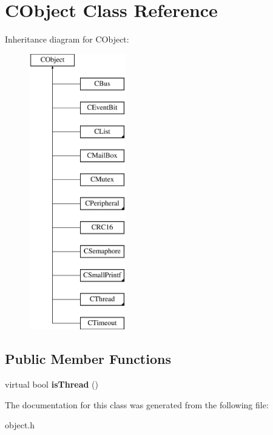 \hypertarget{class_c_object}{\section{C\-Object Class Reference}
\label{class_c_object}
}
Inheritance diagram for C\-Object\-:\begin{figure}[H]
\begin{center}
\leavevmode
\includegraphics[height=12.000000cm]{class_c_object}
\end{center}
\end{figure}
\subsection*{Public Member Functions}
\begin{DoxyCompactItemize}
\item 
\hypertarget{class_c_object_a26a76c241a4d62d2efdac57d2cfe4c0f}{virtual bool {\bfseries is\-Thread} ()}\label{class_c_object_a26a76c241a4d62d2efdac57d2cfe4c0f}

\end{DoxyCompactItemize}


The documentation for this class was generated from the following file\-:\begin{DoxyCompactItemize}
\item 
object.\-h\end{DoxyCompactItemize}
